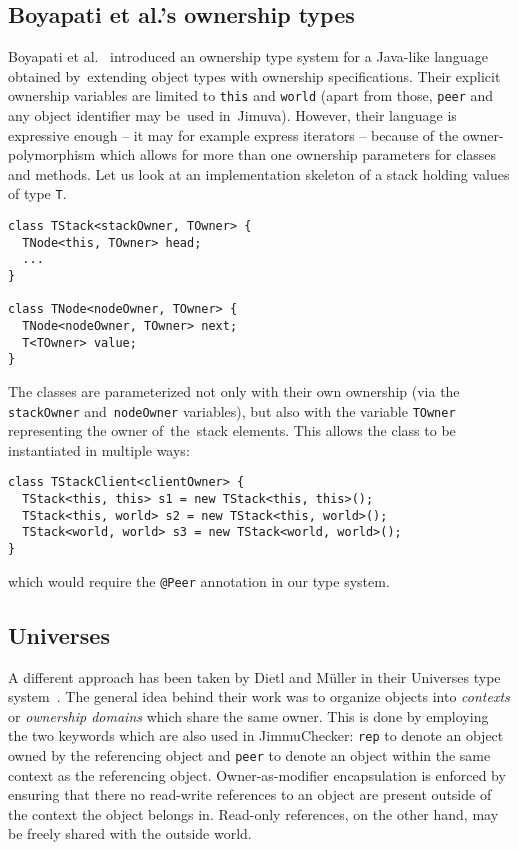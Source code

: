 \documentclass{pracamgr}
\theoremstyle{break}
\theoremstyle{break}
\theoremstyle{break}
\begin{document}
\subsection{Boyapati et al.'s ownership types}

Boyapati et al.~\cite{own-encap} introduced an ownership type system
for a Java-like language obtained by~extending object types with
ownership specifications. Their explicit ownership variables are
limited to \texttt{this} and \texttt{world} (apart from those,
\texttt{peer} and any object identifier may be~used
in~Jimuva). However, their language is expressive enough -- it may for
example express iterators -- because of the owner-polymorphism which
allows for more than one ownership parameters for classes and
methods. Let us look at an implementation skeleton of a stack holding
values of type \texttt{T}.

\begin{lstlisting}
class TStack<stackOwner, TOwner> {
  TNode<this, TOwner> head;
  ...
}

class TNode<nodeOwner, TOwner> {
  TNode<nodeOwner, TOwner> next;
  T<TOwner> value; 
}
\end{lstlisting}

The classes are parameterized not only with their own ownership (via
the \texttt{stackOwner} and~\texttt{nodeOwner} variables), but also
with the variable \texttt{TOwner} representing the owner of~the~stack
elements. This allows the class to be instantiated in multiple ways:
\begin{lstlisting}
class TStackClient<clientOwner> {
  TStack<this, this> s1 = new TStack<this, this>();
  TStack<this, world> s2 = new TStack<this, world>();
  TStack<world, world> s3 = new TStack<world, world>();
}
\end{lstlisting}
which would require the \texttt{@Peer} annotation in our type system. 

\subsection{Universes}

A different approach has been taken by Dietl and Müller in their
Universes type system~\cite{universes}. The general idea behind their
work was to organize objects into \emph{contexts} or \emph{ownership
  domains} which share the same owner. This is done by employing the
two keywords which are also used in JimmuChecker: \texttt{rep} to
denote an object owned by the referencing object and \texttt{peer} to
denote an object within the same context as the referencing
object. Owner-as-modifier encapsulation is enforced by ensuring that
there no read-write references to an object are present outside of the
context the object belongs in. Read-only references, on the other
hand, may be freely shared with the outside world.
\end{document}
